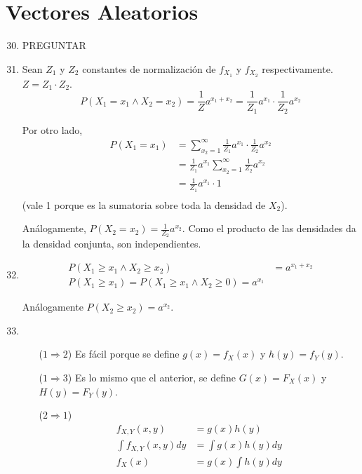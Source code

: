 \section{Vectores Aleatorios}
\begin{enumerate}
	\setcounter{enumi}{29}
	\item
		PREGUNTAR
	\item
		Sean $Z_1$ y $Z_2$ constantes de normalización de $f_{X_1}$ y $f_{X_2}$ respectivamente. $Z = Z_1\cdot Z_2$.
		$$P(X_1 = x_1 \land X_2 = x_2) = \frac{1}{Z}a^{x_1+x_2} = \frac{1}{Z_1}a^{x_1}\cdot \frac{1}{Z_2}a^{x_2}$$
		
		Por otro lado,
		\begin{align*}
			P(X_1 = x_1) & = \sum_{x_2 = 1}^{\infty} \frac{1}{Z_1}a^{x_1}\cdot \frac{1}{Z_2}a^{x_2} \\
			             & = \frac{1}{Z_1}a^{x_1} \sum_{x_2 = 1}^{\infty} \frac{1}{Z_2}a^{x_2} \\
			             & = \frac{1}{Z_1}a^{x_1} \cdot 1 \\
		\end{align*}
		(vale 1 porque es la sumatoria sobre toda la densidad de $X_2$).
		
		Análogamente, $P(X_2 = x_2) = \frac{1}{Z_2}a^{x_2}$. Como el producto de las densidades da la densidad conjunta, son independientes.
		
	\item
		\begin{align*}
			P(X_1 \geq x_1 \land X_2 \geq x_2)	& = a^{x_1 + x_2}			\\
			P(X_1 \geq x_1) = P(X_1 \geq x_1 \land X_2 \geq 0) = a^{x_1}
		\end{align*}
		
		Análogamente $P(X_2 \geq x_2) = a^{x_2}$.
		
	\item \hfill 
		\begin{itemize}				
			\item[($1\Rightarrow 2$)]
				Es fácil porque se define $g(x) = f_X(x)$ y $h(y) = f_Y(y)$.
			
			\item[($1\Rightarrow 3$)]
				Es lo mismo que el anterior, se define $G(x) = F_X(x)$ y $H(y) = F_Y(y)$.
				
			\item[($2\Rightarrow 1$)]
				\begin{align*}				
					f_{X,Y}(x,y)		& = g(x)h(y)			\\
					\int f_{X,Y}(x,y)dy	& = \int g(x)h(y) dy	\\
					f_X(x)				& = g(x) \int h(y) dy
				\end{align*}
				

\end{itemize}
\end{enumerate}
